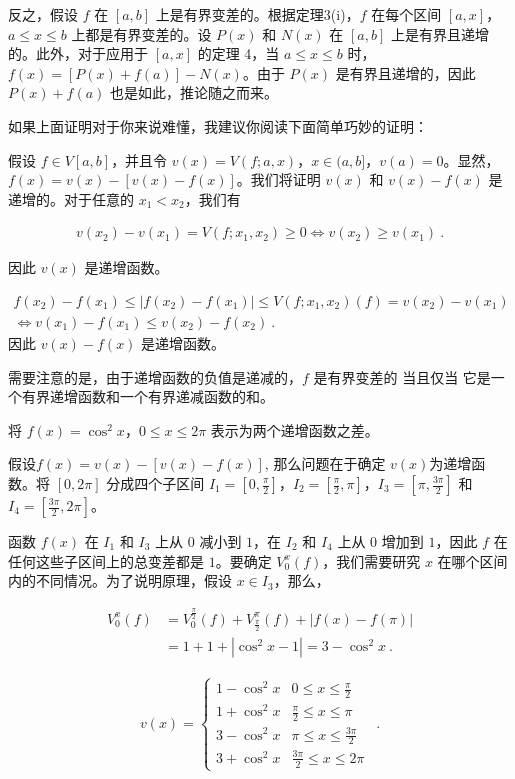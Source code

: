 反之，假设 $f$ 在 $[a,b]$ 上是有界变差的。根据定理3(i)，$f$ 在每个区间 $[a,x]$，$a\leq x\leq b$ 上都是有界变差的。设 $P(x)$ 和 $N(x)$ 在 $[a,b]$ 上是有界且递增的。此外，对于应用于 $[a,x]$ 的定理 4，当 $a\leq x\leq b$ 时，$f(x)=[P(x)+f(a)]-N(x)$。由于 $P(x)$ 是有界且递增的，因此 $P(x)+f(a)$ 也是如此，推论随之而来。

如果上面证明对于你来说难懂，我建议你阅读下面简单巧妙的证明：

假设 $f\in V[a,b]$，并且令 $v(x)=V(f;a,x)$，$x\in(a,b]$，$v(a)=0$。显然，$f(x)=v(x)-[v(x)-f(x)]$。我们将证明 $v(x)$ 和 $v(x)-f(x)$ 是递增的。对于任意的 $x_{1}<x_{2}$，我们有


\begin{align}
 v(x_{2})-v(x_{1})=V(f;x_1,x_2)\geq0\Leftrightarrow v(x_{2})\geq v(x_{1}) ~.
\end{align}

因此 $v(x)$ 是递增函数。

\begin{align}
f(x_{2})-f(x_{1})\leq|f(x_{2})-f(x_{1})|\leq V(f;x_1,x_2) (f)=v(x_{2})-v(x_{1}) \\ \Leftrightarrow v(x_{1})-f(x_{1})\leq v(x_{2})-f(x_{2}) ~.
\end{align}
因此 $v(x)-f(x)$ 是递增函数。

需要注意的是，由于递增函数的负值是递减的，$f$ 是有界变差的 当且仅当 它是一个有界递增函数和一个有界递减函数的和。

\begin{example}{将 $f(x)=\cos^{2}x$，$0\leq x\leq2\pi$ 表示为两个递增函数之差。}

假设$f(x) = v(x) - [v(x)-f(x)]$, 那么问题在于确定 $v(x)$为递增函数。将 $[0,2\pi]$ 分成四个子区间 $I_{1}=[0,\frac{\pi}{2}]$，$I_{2}=[\frac{\pi}{2},\pi]$，$I_{3}=[\pi,\frac{3\pi}{2}]$ 和 $I_{4}=[\frac{3\pi}{2},2\pi]$。

函数 $f(x)$ 在 $I_{1}$ 和 $I_{3}$ 上从 $0$ 减小到 $1$，在 $I_{2}$ 和 $I_{4}$ 上从 $0$ 增加到 $1$，因此 $f$ 在任何这些子区间上的总变差都是 $1$。要确定 $V_{0}^{x}(f)$，我们需要研究 $x$ 在哪个区间内的不同情况。为了说明原理，假设 $x\in I_{3}$，那么，

\begin{align}
V_{0}^{x}(f)&=V_{0}^{\frac{\pi}{2}}(f)+V_{\frac{\pi}{2}}^{\pi}(f)+|f(x)-f(\pi)| \\ &=1+1+|\cos^{2}x-1|=3-\cos^{2}x ~.
\end{align}


\begin{align}
 v(x)=\left\{\begin{array}{ll}1-\cos^2x&0\leq x\leq\frac{\pi}{2}\\ 1+\cos^2x&\frac{\pi}{2}\leq x\leq\pi\\ 3-\cos^2x&\pi\leq x\leq\frac{3\pi}{2}\\ 3+\cos^2x&\frac{3\pi}{2}\leq x\leq2\pi\end{array}\right. \ ~. 
\end{align}


\end{example}